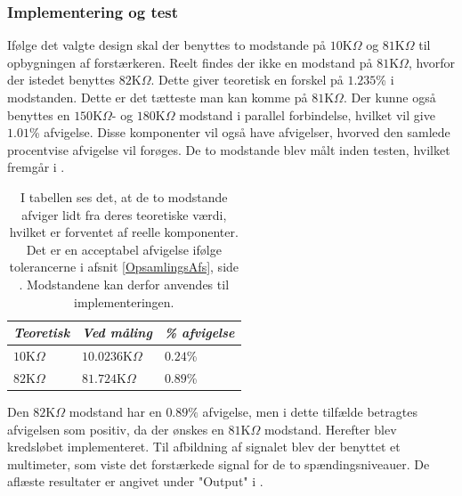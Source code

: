 \subsubsection{Implementering og test}
Ifølge det valgte design skal der benyttes to modstande på $10$K$\Omega$ og $81$K$\Omega$ til opbygningen af forstærkeren. Reelt findes der ikke en modstand på $81$K$\Omega$, hvorfor der istedet benyttes $82$K$\Omega$. Dette giver teoretisk en forskel på $1.235$\% i modstanden. Dette er det tætteste man kan komme på $81$K$\Omega$. Der kunne også benyttes en $150$K$\Omega$- og $180$K$\Omega$ modstand i parallel forbindelse, hvilket vil give $1.01$\% afvigelse. Disse komponenter vil også have afvigelser, hvorved den samlede procentvise afvigelse vil forøges. De to modstande blev målt inden testen, hvilket fremgår i .
\begin{table}[H]
	\centering
	\begin{tabular}{|l|l|l|}
		\hline
		\textit{Teoretisk} & \textit{Ved måling} & \textit{\% afvigelse} \\ \hline
		$10$K$\Omega$      & $10.0236$K$\Omega$    & $0.24$\%           \\ \hline
		$82$K$\Omega$      & $81.724$K$\Omega$     & $0.89$\%           \\ \hline
	\end{tabular}
	\caption{I tabellen ses det, at de to modstande afviger lidt fra deres teoretiske værdi, hvilket er forventet af reelle komponenter. Det er en acceptabel afvigelse ifølge tolerancerne i afsnit \ref{OpsamlingsAfs}, side \pageref{OpsamlingsAfs}. Modstandene kan derfor anvendes til implementeringen.}
	\label{Tab:modstand_faktor18}
\end{table}
\noindent Den $82$K$\Omega$ modstand har en $0.89\%$ afvigelse, men i dette tilfælde betragtes afvigelsen som positiv, da der ønskes en $81$K$\Omega$ modstand. Herefter blev kredsløbet implementeret. Til afbildning af signalet blev der benyttet et multimeter, som viste det forstærkede signal for de to spændingsniveauer. De aflæste resultater er angivet under "Output" i .\

